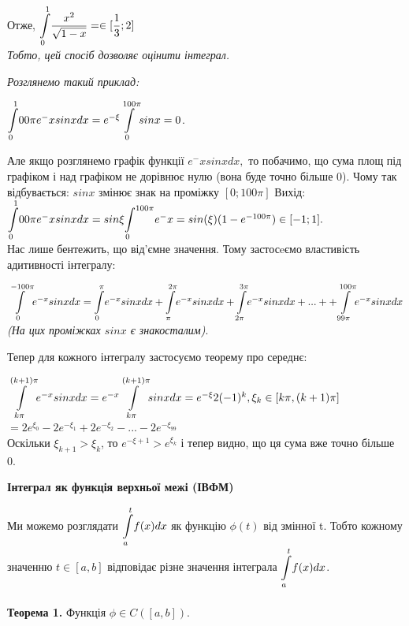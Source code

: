 \documentclass[12pt]{report}
\begin{document}
Отже, $ \mathlarger\int\limits_0^1 \dfrac{x^2}{\sqrt{1-x}}  = \in [\dfrac{1}{3}; 2] $\\
\textit{Тобто, цей спосіб дозволяє оцінити інтеграл.}


\vspace{5mm} 

\textit{Розглянемо такий приклад:}

$ \mathlarger\int\limits_0^100\pi e^-xsinx dx= e^{-\xi}\mathlarger\int\limits_0^{100\pi} sinx = 0 $.

Але якщо розглянемо графік функції $ e^-xsinxdx,  $ то побачимо, що сума площ під графіком і над графіком не дорівнює нулю (вона буде точно більше 0).
Чому так відбувається:   $ sinx $ змінює знак на проміжку $[0;100\pi]$
Вихід: $ \mathlarger\int\limits_0^100\pi e^-xsinx dx = sin \xi \mathlarger\int\limits_0 ^{100\pi}e^-x = 
sin(\xi)(1-e^{-100\pi}) \in [-1;1].$\\
Нас лише бентежить, що від'ємне значення. Тому застосeємо властивість адитивності інтегралу:

$\mathlarger\int\limits_0^{-100\pi} e^{-x}sinxdx=\mathlarger\int\limits_0^{\pi}e^{-x}sinxdx+ \mathlarger\int\limits_\pi^{2\pi}e^{-x}sinxdx+ \mathlarger\int\limits_{2\pi}^{3\pi}e^{-x}sinxdx + ... +  +\mathlarger\int\limits_{99\pi}^{100\pi}e^{-x}sinxdx $
\textit{(На цих проміжках $ sinx  $ є знакосталим)}.

Тепер для кожного інтегралу застосуємо теорему про середнє:

$ \mathlarger\int\limits_{k\pi}^{(k+1)\pi} e^{-x}sinx dx = e^{-x}\mathlarger\int\limits_{k\pi}^{(k+1)\pi} sinx dx = e^{-\xi}2(-1)^k, \xi_k \in [k\pi, (k+1)\pi]$\\

$ =2e^{\xi_0} - 2e^{-\xi_1}+2e^{-\xi_2}- ... - 2e^{-\xi_99}$\\
 Оскільки $\xi_{k+1}>\xi_k$, то $ e^{-\xi+1} >e^{\xi_k}$
і тепер видно, що ця сума вже точно більше 0.

	\begin{center}
	\textbf{\Large Інтеграл як функція верхньої межі (ІВФМ)} 
\end{center}

Ми можемо розглядати $\mathlarger\int\limits_a^t f(x)dx  $ як функцію $ \phi (t) $ від змінної t.
Тобто кожному значенню $ t \in [a,b] $ відповідає різне значення інтеграла  $\mathlarger\int\limits_a^t f(x)dx  $.\\ \\


\textbf{Теорема 1.} Функція $ \phi \in C([a,b]). $
\end{document}
